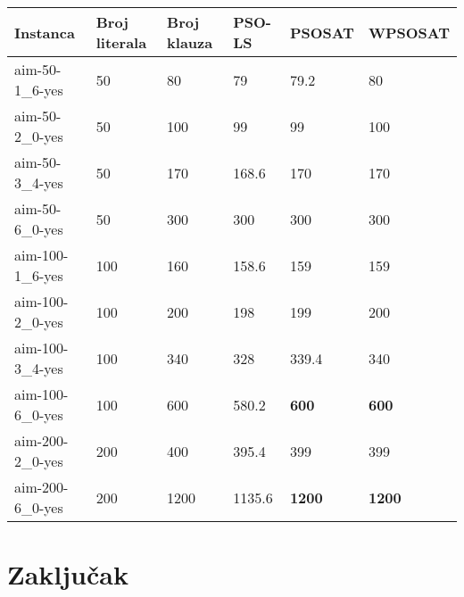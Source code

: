 \documentclass{article}
\begin{document}
\begin{table}[h!]
\centering
{}\label{tab:SAT} 
\begin{tabular}{ |p{3cm}|p{2cm}|p{2cm}||p{2cm}|p{2cm}|p{2cm}|}  \hline
 Instanca & Broj literala & Broj klauza & PSO-LS & PSOSAT & WPSOSAT \\ \hline
 aim-50-1\_6-yes & 50 & 80 & 79 & 79.2 & 80 \\ \hline
 aim-50-2\_0-yes & 50 & 100 & 99 & 99 & 100 \\ \hline
 aim-50-3\_4-yes & 50 & 170 & 168.6 & 170 & 170 \\ \hline
 aim-50-6\_0-yes & 50 & 300 & 300 & 300 & 300 \\ \hline
 \hline
 aim-100-1\_6-yes & 100 & 160 & 158.6 & 159 & 159 \\ \hline
 aim-100-2\_0-yes & 100 & 200 & 198 & 199 & 200 \\ \hline
 aim-100-3\_4-yes & 100 & 340 & 328 & 339.4 & 340 \\ \hline
 aim-100-6\_0-yes & 100 & 600 & 580.2 & \textbf{600} & \textbf{600} \\ \hline
 \hline
 aim-200-2\_0-yes & 200 & 400 & 395.4 & 399 & 399 \\ \hline
 aim-200-6\_0-yes & 200 & 1200 & 1135.6 & \textbf{1200} & \textbf{1200} \\ \hline
\end{tabular}
\end{table}



\section{Zaključak}
\label{sec:zakljucak}

\appendix
 

\end{document}
